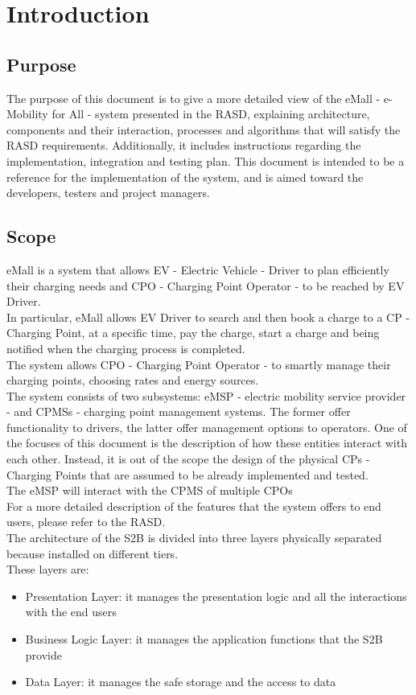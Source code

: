 \section{Introduction}
\subsection{Purpose}

The purpose of this document is to give a more detailed view of the eMall - e-Mobility for All - system presented in
the RASD, explaining architecture, components and their interaction, processes and algorithms that will satisfy the RASD requirements.
Additionally, it includes instructions regarding the implementation, integration and testing plan.
This document is intended to be a reference for the implementation of the system, and is aimed toward the developers, testers and project managers.

\subsection{Scope}
eMall is a system that allows EV - Electric Vehicle - Driver to plan efficiently their charging needs and CPO - Charging Point Operator - to be reached by EV Driver.
\\In particular, eMall allows EV Driver to search and then book a charge to a CP - Charging Point, at a specific
time, pay the charge, start a charge and being notified when the charging process is completed.
\\The system allows CPO - Charging Point Operator - to smartly manage their charging points, choosing rates and energy sources.
\\The system consists of two subsystems: eMSP - electric mobility service provider - and CPMSs - charging point management systems. The former offer functionality to drivers, the latter offer management options to operators. One of the focuses of this document is the description of how these entities interact with each other. Instead, it is out of the scope the design of the physical CPs - Charging Points that are assumed to be already implemented and tested.
\\The eMSP will interact with the CPMS of multiple CPOs
\\For a more detailed description of the features that the system offers to end users, please refer to the RASD.
\\
The architecture of the S2B is divided into three layers physically separated because installed on different tiers.
\\These layers are:
\begin{itemize}
    \item Presentation Layer: it manages the presentation logic and all the interactions with the end users
    \item Business Logic Layer: it manages the application functions that the S2B provide
    \item Data Layer: it manages the safe storage and the access to data
\end{itemize}
